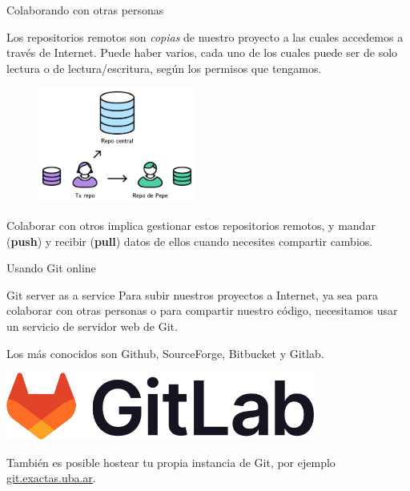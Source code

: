 \documentclass{beamer}
\begin{document}
\begin{frame}{Colaborando con otras personas}

    Los repositorios remotos son \textit{copias} de nuestro proyecto a las cuales accedemos a través
    de Internet. Puede haber varios, cada uno de los cuales
    puede ser de solo lectura o de lectura/escritura, según los permisos que tengamos.

    \begin{figure}[ht]
        \begin{center}
            \includegraphics[height=1.5in]{images/repo-remoto.pdf}
        \end{center}
    \end{figure}

    Colaborar con otros implica gestionar estos repositorios remotos, y mandar (\textbf{push}) y recibir (\textbf{pull})
    datos de ellos cuando necesites compartir cambios.

\end{frame}

\begin{frame}{Usando Git online}
\begin{block}{Git server as a service}
    Para subir nuestros proyectos a Internet, ya sea para colaborar con otras personas o para compartir nuestro código, necesitamos usar un servicio de servidor web de Git.

    Los más conocidos son Github, SourceForge, Bitbucket y Gitlab. 
    \end{block}
    \begin{center}
        \includegraphics[width=4in]{images/gitlab-logo-100.png}
    \end{center}

    También es posible hostear tu propia instancia de Git, por ejemplo \href{https://git.exactas.uba.ar/}{git.exactas.uba.ar}.

    
\end{frame}
\end{document}
